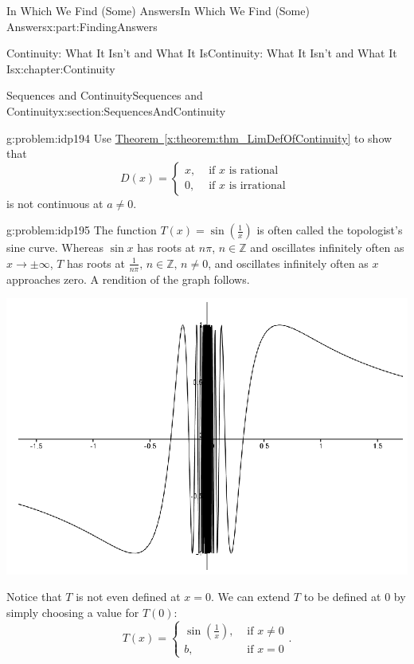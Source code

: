 \documentclass[oneside,10pt,]{book}
\newcommand{\xreffont}{\relax}
\numberwithin{equation}{section}
\newcommand{\ZZ}{\mathbb {Z}}
\newcommand{\amp}{&}
\begin{document}
\begin{partptx}{In Which We Find (Some) Answers}{}{In Which We Find (Some) Answers}{}{}{x:part:FindingAnswers}
\begin{chapterptx}{Continuity: What It Isn't and What It Is}{}{Continuity: What It Isn't and What It Is}{}{}{x:chapter:Continuity}
\begin{sectionptx}{Sequences and Continuity}{}{Sequences and Continuity}{}{}{x:section:SequencesAndContinuity}
\begin{problem}{}{g:problem:idp194}%
Use \hyperref[x:theorem:thm_LimDefOfContinuity]{Theorem~{\xreffont\ref{x:theorem:thm_LimDefOfContinuity}}} to show that%
\begin{equation*}
D(x)= \begin{cases}
x, \amp \text{ if } x\text{ is rational } \\
0, \amp \text{ if } x\text{ is irrational } \end{cases}  
\end{equation*}
is not continuous at \(a\neq 0\).%
\end{problem}
\begin{problem}{}{g:problem:idp195}%
The function \(T(x)=\sin\left(\frac{1}{x}\right)\) is often called the topologist's sine curve.  Whereas \(\sin
x\) has roots at \(n\pi\), \(n\in\ZZ\) and oscillates infinitely often as \(x\rightarrow\pm\infty\), \(T\) has roots at \(\frac{1}{n\pi},\,n\in\ZZ,\,n\neq
0\), and oscillates infinitely often as \(x\) approaches zero.  A rendition of the graph follows.%
\begin{image}{0.125}{0.75}{0.125}%
\includegraphics[width=\linewidth]{images/Ch5fig7.png}
\end{image}%
Notice that \(T\) is not even defined at \(x=0\). We can extend \(T\) to be defined at 0 by simply choosing a value for \(T(0):\)%
\begin{equation*}
T(x)= \begin{cases}
\sin\left(\frac{1}{x}\right),\amp \text{ if } x\neq 0\\ 
b,\amp \text{ if } x=0 \end{cases} \text{.}
\end{equation*}

\end{problem}
\end{sectionptx}
\end{chapterptx}
\end{partptx}
\end{document}
